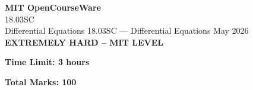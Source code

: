 \documentclass[12pt,a4paper]{exam}
\begin{document}
\begin{center}
{\LARGE \textbf{MIT OpenCourseWare}}\\18.03SC\\Differential Equations
\vspace{0.5cm}
{18.03SC} --- {Differential Equations}
\vspace{0.3cm}
May 2026
\vspace{0.3cm}
\textbf{EXTREMELY HARD -- MIT LEVEL}
\end{center}

\begin{center}
\textbf{Time Limit: 3 hours}
\end{center}

\begin{center}
\textbf{Total Marks: 100}
\end{center}

\vspace{0.5cm}
\end{document}
